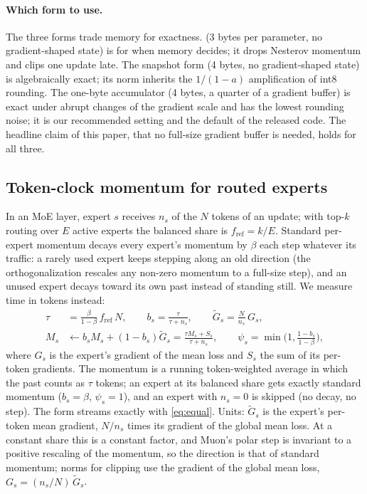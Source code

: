 \documentclass[10pt]{article}
\begin{document}
\paragraph{Which form to use.} The three forms trade memory for exactness. \lite{} (3 bytes per parameter, no
gradient-shaped state) is for when memory decides; it drops Nesterov momentum and clips one update late. The
snapshot form (4 bytes, no gradient-shaped state) is algebraically exact; its norm inherits the $1/(1-a)$
amplification of int8 rounding. The one-byte accumulator (4 bytes, a quarter of a gradient buffer) is exact under
abrupt changes of the gradient scale and has the lowest rounding noise; it is our recommended setting and the default
of the released code. The headline claim of this paper, that no full-size gradient buffer is needed, holds for all
three.

\subsection{Token-clock momentum for routed experts}
\label{sec:clock}
In an MoE layer, expert $s$ receives $n_s$ of the $N$ tokens of an update; with top-$k$ routing over $E$ active
experts the balanced share is $f_{\mathrm{ref}}=k/E$. Standard per-expert momentum decays every expert's momentum by
$\beta$ each step whatever its traffic: a rarely used expert keeps stepping along an old direction (the
orthogonalization rescales any non-zero momentum to a full-size step), and an unused expert decays toward its own past
instead of standing still. We measure time in tokens instead:
\begin{align}
  \tau &= \tfrac{\beta}{1-\beta}\,f_{\mathrm{ref}}\,N, \qquad b_s=\frac{\tau}{\tau+n_s},\qquad
  \tilde G_s=\frac{N}{n_s}\,G_s, \label{eq:clock}\\
  M_s &\leftarrow b_s M_s+(1-b_s)\tilde G_s=\frac{\tau M_s+S_s}{\tau+n_s},\qquad
  \psi_s=\min\!\Big(1,\frac{1-b_s}{1-\beta}\Big),
\end{align}
where $G_s$ is the expert's gradient of the mean loss and $S_s$ the sum of its per-token gradients. The momentum is a
running token-weighted average in which the past counts as $\tau$ tokens; an expert at its balanced share gets exactly
standard momentum ($b_s=\beta$, $\psi_s=1$), and an expert with $n_s=0$ is skipped (no decay, no step). The form
streams exactly with \eqref{eq:equal}. Units: $\tilde G_s$ is the expert's per-token mean gradient, $N/n_s$ times its
gradient of the global mean loss. At a constant share this is a constant factor, and Muon's polar step is invariant to
a positive rescaling of the momentum, so the direction is that of standard momentum; norms for clipping use the
gradient of the global mean loss, $G_s=(n_s/N)\,\tilde G_s$.
\end{document}
